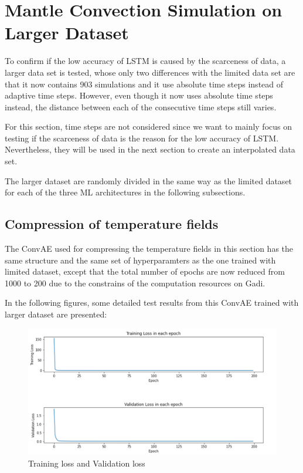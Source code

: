 \section{Mantle Convection Simulation on Larger Dataset}

To confirm if the low accuracy of LSTM is caused by the scarceness of data, a larger data set is tested, whose only two differences with the limited data set are that it now contains 903 simulations and it use absolute time steps instead of adaptive time steps. However, even though it now uses absolute time steps instead, the distance between each of the consecutive time steps still varies.

For this section, time steps are not considered since we want to mainly focus on testing if the scarceness of data is the reason for the low accuracy of LSTM. Nevertheless, they will be used in the next section to create an interpolated data set.

The larger dataset are randomly divided in the same way as the limited dataset for each of the three ML architectures in the following subsections.

\subsection{Compression of temperature fields}

The ConvAE used for compressing the temperature fields in this section has the same structure and the same set of hyperparamters as the one trained with limited dataset, except that the total number of epochs are now reduced from 1000 to 200 due to the constrains of the computation resources on Gadi.

In the following figures, some detailed test results from this ConvAE trained with larger dataset are presented:

\begin{figure}[H]
    \caption{Training loss and Validation loss}
    \includegraphics[scale=0.6]{Report LaTeX/figures/mantle_convection_images/larger_dataset/ConvAE_trainingData.png}
\end{figure}


